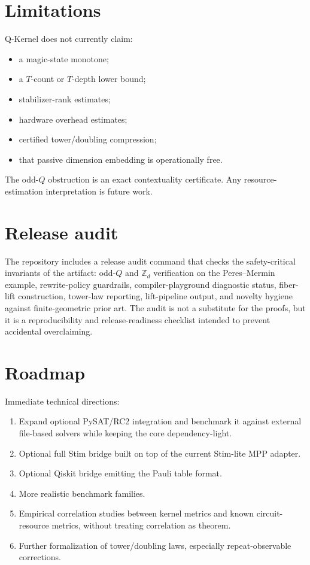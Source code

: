 \documentclass[11pt]{article}
\begin{document}
\section{Limitations}

Q-Kernel does not currently claim:
\begin{itemize}[leftmargin=*]
  \item a magic-state monotone;
  \item a \(T\)-count or \(T\)-depth lower bound;
  \item stabilizer-rank estimates;
  \item hardware overhead estimates;
  \item certified tower/doubling compression;
  \item that passive dimension embedding is operationally free.
\end{itemize}
The odd-\(Q\) obstruction is an exact contextuality certificate.  Any resource-estimation interpretation is future work.


\section{Release audit}

The repository includes a release audit command that checks the safety-critical invariants of the artifact: odd-\(Q\) and \(\mathbb{Z}_d\) verification on the Peres--Mermin example, rewrite-policy guardrails, compiler-playground diagnostic status, fiber-lift construction, tower-law reporting, lift-pipeline output, and novelty hygiene against finite-geometric prior art.  The audit is not a substitute for the proofs, but it is a reproducibility and release-readiness checklist intended to prevent accidental overclaiming.


\section{Roadmap}

Immediate technical directions:
\begin{enumerate}[leftmargin=*]
  \item Expand optional PySAT/RC2 integration and benchmark it against external file-based solvers while keeping the core dependency-light.
  \item Optional full Stim bridge built on top of the current Stim-lite MPP adapter.
  \item Optional Qiskit bridge emitting the Pauli table format.
  \item More realistic benchmark families.
  \item Empirical correlation studies between kernel metrics and known circuit-resource metrics, without treating correlation as theorem.
  \item Further formalization of tower/doubling laws, especially repeat-observable corrections.
\end{enumerate}
\end{document}
